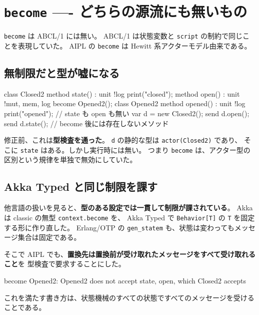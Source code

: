 \documentclass[11pt,a4paper]{ltjsarticle}
\theoremstyle{definition}
\theoremstyle{remark}
\begin{document}
\section{\texttt{become} ---- どちらの源流にも無いもの}
\label{sec:become}

\texttt{become} は ABCL/1 には無い。
ABCL/1 は状態変数と \texttt{script} の制約で同じことを表現していた。
AIPL の \texttt{become} は Hewitt 系アクターモデル由来である。

\subsection{無制限だと型が嘘になる}

\begin{aipl}
class Closed2 {
  method state() : unit !{log} { print("closed"); }
  method open()  : unit !{mut, mem, log} { become Opened2(); }
}
class Opened2 {
  method opened() : unit !{log} { print("opened"); }   // state も open も無い
}
var d = new Closed2();
send d.open();
send d.state();        // become 後には存在しないメソッド
\end{aipl}

修正前、これは\textbf{型検査を通った}。
\texttt{d} の静的な型は \texttt{actor(Closed2)} であり、
そこに \texttt{state} はある。しかし実行時には無い。
つまり \texttt{become} は、アクター型の区別という規律を単独で無効にしていた。

\subsection{Akka Typed と同じ制限を課す}

他言語の扱いを見ると、\textbf{型のある設定では一貫して制限が課されている}。
Akka は classic の無型 \texttt{context.become} を、
Akka Typed で \texttt{Behavior[T]} の \texttt{T} を固定する形に作り直した。
Erlang/OTP の \texttt{gen\_statem} も、状態は変わってもメッセージ集合は固定である。

そこで AIPL でも、\textbf{置換先は置換前が受け取れたメッセージをすべて受け取れること}を
型検査で要求することにした。

\begin{term}
 become Opened2: Opened2 does not accept state, open,
             which Closed2 accepts
\end{term}

これを満たす書き方は、状態機械のすべての状態ですべてのメッセージを受けることである。
\end{document}
